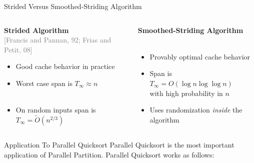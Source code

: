 \documentclass[table,serif,mathserif,final]{beamer}
\newcommand{\citefont}[1]{{\huge \textcolor{gray}{#1}}}
\theoremstyle{remark}
\begin{document}
\begin{frame}{}
\begin{columns}[t]
\begin{column}{0.2\linewidth}
\vspace{0.5cm}
\begin{block}{\Huge Strided Versus Smoothed-Striding Algorithm}
  \Huge
	\begin{columns}[T] %
	\begin{column}{.4\textwidth}
		\textbf{Strided Algorithm}\\\citefont{[Francis and Pannan, 92; Frias and Petit, 08]}\\
		\vspace{0.25cm}
		\begin{itemize}
			\item Good cache behavior in practice\\\hfill
			\item Worst case span is $T_\infty \approx n$\\\hfill\\\hfill
			\item On random inputs span is $T_\infty = \tilde{O}(n^{2/3})$
		\end{itemize}
	\end{column}
	\hfill
	\begin{column}{.5\textwidth}
		\textbf{Smoothed-Striding Algorithm}\\\citefont{}\\
		\vspace{0.25cm}
		\begin{itemize}
			\item Provably optimal cache behavior\\\hfill
			\item Span is \\$T_\infty = O(\log n \log\log n)$\\ with high probability in $n$\\\hfill
			\item Uses randomization \emph{inside} the algorithm %
		\end{itemize}
	\end{column}
	\end{columns}

\end{block}

\vspace{0.5cm}
\begin{block}{\Huge Application To Parallel Quicksort}
  \Huge
  Parallel Quicksort is the most important application of Parallel Partition. Parallel Quicksort works as follows:


\end{block}
\end{column}
\end{columns}
\end{frame}
\end{document}
